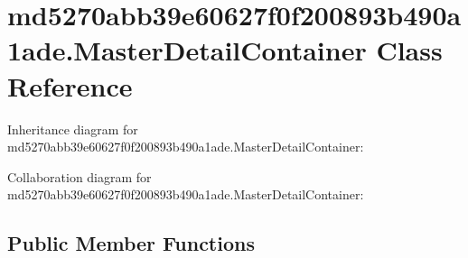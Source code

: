 \hypertarget{classmd5270abb39e60627f0f200893b490a1ade_1_1_master_detail_container}{}\section{md5270abb39e60627f0f200893b490a1ade.\+Master\+Detail\+Container Class Reference}
\label{classmd5270abb39e60627f0f200893b490a1ade_1_1_master_detail_container}


Inheritance diagram for md5270abb39e60627f0f200893b490a1ade.\+Master\+Detail\+Container\+:


Collaboration diagram for md5270abb39e60627f0f200893b490a1ade.\+Master\+Detail\+Container\+:
\subsection*{Public Member Functions}
